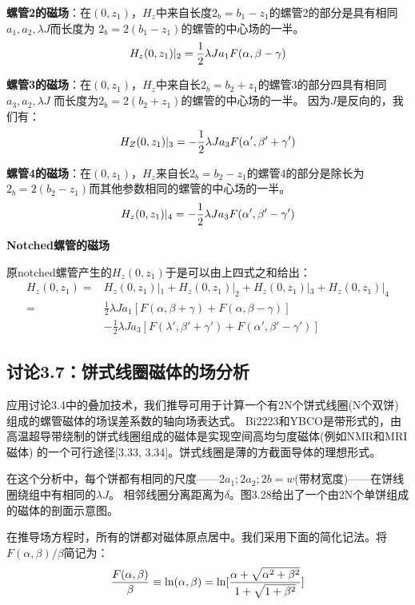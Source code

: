 \textbf{螺管2的磁场}：在$(0, z_1)$，$H_z$中来自长度$2_b = b_1−z_1$的螺管2的部分是具有相同$a_1, a_2,\lambda J$而长度为
$2_b = 2(b_1−z_1)$的螺管的中心场的一半。
$$
H_{z}(0,z_{1})|_{2}=\frac{1}{2}\lambda Ja_{1}F(\alpha,\beta-\gamma)\\%
$$

\textbf{螺管3的磁场}：在$(0, z_1)$，$H_z$中来自长$2_b=b_2+z_1$的螺管3的部分四具有相同$a_3, a_2,\lambda J$
而长度为$2_b=2(b_2+z_1)$的螺管的中心场的一半。
因为$J$是反向的，我们有：
$$
H_{Z}(0,z_{1})|_{3}=-\frac{1}{2}\lambda Ja_{3}F(\alpha',\beta'+\gamma')\\%
$$

\textbf{螺管4的磁场}：在$(0, z_1)$，$H_z$来自长$2_b = b_2−z_1$的螺管4的部分是除长为$2_b = 2(b_2−z_1)$而其他参数相同的螺管的中心场的一半。
$$
H_{z}(0,z_{1})|_{4}=-\frac{1}{2}\lambda Ja_{3}F(\alpha',\beta'-\gamma')\\%
$$

\textbf{Notched螺管的磁场}

原notched螺管产生的$H_z(0,z_1)$于是可以由上四式之和给出：
\begin{equation}%
\begin{split}
 H_{z}(0,z_{1}) =&H_{z}(0,z_{1})|_{1}+H_{z}(0,z_{1})|_{2}+H_{z}(0,z_{1})|_{3}+H_{z}(0,z_{1})|_{4} \\
=&\frac{1}{2}\lambda J a_{1}[F(\alpha,\beta+\gamma)+F(\alpha,\beta-\gamma)] \\%
&-\frac{1}{2}\lambda J a_{3}[F(\lambda',\beta'+\gamma')+F(\alpha',\beta'-\gamma')]
\end{split}
\end{equation}
\newpage


\subsection{讨论3.7：饼式线圈磁体的场分析}
应用讨论3.4中的叠加技术，我们推导可用于计算一个有2N个饼式线圈(N个双饼)组成的螺管磁体的场误差系数的轴向场表达式。
Bi2223和YBCO是带形式的，由高温超导带绕制的饼式线圈组成的磁体是实现空间高均匀度磁体(例如NMR和MRI磁体)
的一个可行途径[3.33, 3.34]。饼式线圈是薄的方截面导体的理想形式。

在这个分析中，每个饼都有相同的尺度——$2a_1;2a_2;2b=w$(带材宽度)——在饼线圈绕组中有相同的$\lambda J$。
相邻线圈分离距离为$\delta$。图3.28给出了一个由2N个单饼组成的磁体的剖面示意图。

在推导场方程时，所有的饼都对磁体原点居中。我们采用下面的简化记法。将$F(\alpha,\beta)/{\beta}$简记为：
\begin{equation}
\frac{F(\alpha,\beta)}{\beta}\equiv \ln(\alpha,\beta)=\ln[\frac{\alpha+\sqrt{\alpha^2+\beta^2}}{1+\sqrt{1+\beta^2}}]\\%
\end{equation}


